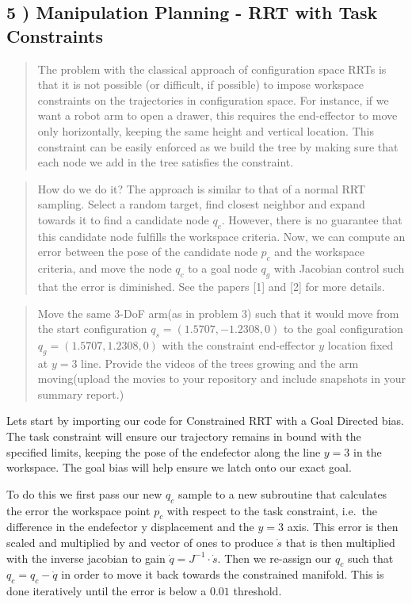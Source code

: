 \documentclass{article}
\begin{document}
    \subsection{5 ) Manipulation Planning - RRT with Task Constraints}


    \begin{quote}
The problem with the classical approach of configuration space RRTs is
that it is not possible (or difficult, if possible) to impose workspace
constraints on the trajectories in configuration space. For instance, if
we want a robot arm to open a drawer, this requires the end-effector to
move only horizontally, keeping the same height and vertical location.
This constraint can be easily enforced as we build the tree by making
sure that each node we add in the tree satisfies the constraint.
\end{quote}

\begin{quote}
How do we do it? The approach is similar to that of a normal RRT
sampling. Select a random target, find closest neighbor and expand
towards it to find a candidate node $q_c$. However, there is no
guarantee that this candidate node fulfills the workspace criteria. Now,
we can compute an error between the pose of the candidate node $p_c$ and
the workspace criteria, and move the node $q_c$ to a goal node $q_g$
with Jacobian control such that the error is diminished. See the papers
{[}1{]} and {[}2{]} for more details.
\end{quote}

\begin{quote}
Move the same $3$-DoF arm(as in problem 3) such that it would move from
the start configuration $q_s = ( 1.5707, -1.2308, 0 )$ to the goal
configuration $q_g = ( 1.5707, 1.2308, 0 )$ with the constraint
end-effector $y$ location fixed at $y = 3$ line. Provide the videos of
the trees growing and the arm moving(upload the movies to your
repository and include snapshots in your summary report.)
\end{quote}

    Lets start by importing our code for Constrained RRT with a Goal
Directed bias. The task constraint will ensure our trajectory remains in
bound with the specified limits, keeping the pose of the endefector
along the line $y=3$ in the workspace. The goal bias will help ensure we
latch onto our exact goal.

To do this we first pass our new $q_c$ sample to a new subroutine that
calculates the error the workspace point $p_c$ with respect to the task
constraint, i.e.~the difference in the endefector y displacement and the
$y=3$ axis. This error is then scaled and multiplied by and vector of
ones to produce $\dot{s}$ that is then multiplied with the inverse
jacobian to gain $\dot{q} = J^{-1} \cdot \dot{s}$. Then we re-assign our
$q_c$ such that $q_c = q_c - \dot{q}$ in order to move it back towards
the constrained manifold. This is done iteratively until the error is
below a $0.01$ threshold.
\end{document}
